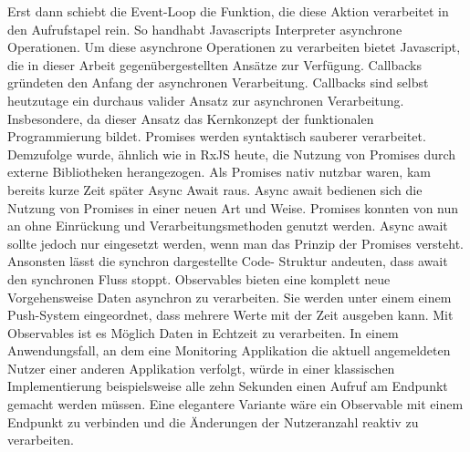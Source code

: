 \noindent
Erst dann schiebt die Event-Loop die Funktion, die diese Aktion verarbeitet in den Aufrufstapel rein. So handhabt Javascripts Interpreter asynchrone Operationen. Um diese asynchrone Operationen zu verarbeiten bietet Javascript, die in dieser Arbeit gegenübergestellten Ansätze zur Verfügung. Callbacks gründeten den Anfang der asynchronen Verarbeitung. Callbacks sind selbst heutzutage ein durchaus valider Ansatz zur asynchronen Verarbeitung. Insbesondere, da dieser Ansatz das Kernkonzept der funktionalen Programmierung bildet. Promises werden syntaktisch \glqq sauberer\grqq{} verarbeitet. Demzufolge wurde, ähnlich wie in RxJS heute, die Nutzung von Promises durch externe Bibliotheken herangezogen. Als Promises nativ nutzbar waren, kam bereits kurze Zeit später Async Await raus. Async await bedienen sich die Nutzung von Promises in einer neuen Art und Weise. Promises konnten von nun an ohne Einrückung und Verarbeitungsmethoden genutzt werden. Async await sollte jedoch nur eingesetzt werden, wenn man das Prinzip der Promises versteht. Ansonsten lässt die synchron dargestellte Code- Struktur andeuten, dass await den synchronen Fluss stoppt. Observables bieten eine komplett neue Vorgehensweise Daten asynchron zu verarbeiten. Sie werden unter einem einem Push-System eingeordnet, dass mehrere Werte mit der Zeit ausgeben kann. Mit Observables ist es Möglich Daten in Echtzeit zu verarbeiten. In einem Anwendungsfall, an dem eine Monitoring Applikation die aktuell angemeldeten Nutzer einer anderen Applikation verfolgt, würde in einer klassischen Implementierung beispielsweise alle zehn Sekunden einen Aufruf am Endpunkt gemacht werden müssen. Eine elegantere Variante wäre ein Observable mit einem Endpunkt zu verbinden und die Änderungen der Nutzeranzahl reaktiv zu verarbeiten.
